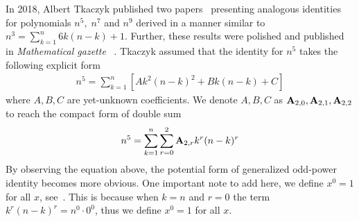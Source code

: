 In 2018, Albert Tkaczyk published two papers~\cite{tkaczyk2018problem, tkaczyk2018continuation}
presenting analogous identities for polynomials $n^5, \; n^7$ and $n^9$
derived in a manner similar to $n^3 = \sum_{k=1}^{n} 6k(n-k) + 1$.
Further, these results were polished and published in \textit{Mathematical gazette}
~\cite{unusual_identity_for_odd_powers}.
Tkaczyk assumed that the identity for $n^5$ takes the following explicit form
\begin{align*}
    n^5 = \sum_{k=1}^{n} \left[ A k^2(n-k)^2 + Bk(n-k) + C \right]
\end{align*}
where $A,B,C$ are yet-unknown coefficients.
We denote $A,B,C$ as ${\mathbf{A}} \sb{2,0}, {\mathbf{A}} \sb{2,1}, {\mathbf{A}} \sb{2,2}$
to reach the compact form of double sum
\begin{align*}
    n^5 = \sum_{k=1}^{n} \sum_{r=0}^{2} {\mathbf{A}} \sb{2,r} k^r (n-k)^r
\end{align*}
By observing the equation above, the potential form of generalized odd-power identity becomes more obvious.
One important note to add here, we define $x^0 = 1$ for all $x$, see~\cite[~p. 162]{graham1994concrete}.
This is because when $k=n$ and $r=0$ the term $k^r (n-k)^r = n^0 \cdot 0^0$, thus we define $x^0 = 1$
for all $x$.


